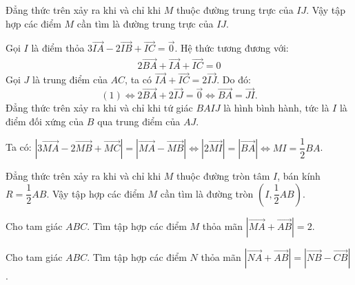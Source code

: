 \begin{bt}
{\begin{listEX}[1]
			Đẳng thức trên xảy ra khi và chỉ khi $M$ thuộc đường trung trực của $IJ$. Vậy tập hợp các điểm $M$ cần tìm là đường trung trực của $IJ$.
			\item Gọi $I$ là điểm thỏa $3\overrightarrow{IA} - 2\overrightarrow{IB} + \overrightarrow{IC} = \overrightarrow{0}$. Hệ thức tương đương với:
			\begin{align*}
			2\overrightarrow{BA} + \overrightarrow{IA} + \overrightarrow{IC} =0 \tag{1}
			\end{align*}
			Gọi $J$ là trung điểm của $AC$, ta có $\overrightarrow{IA} + \overrightarrow{IC} = 2\overrightarrow{IJ}$. Do đó:
			$$(1) \Leftrightarrow 2\overrightarrow{BA} + 2\overrightarrow{IJ} = \overrightarrow{0} \Leftrightarrow\overrightarrow{BA} = \overrightarrow{JI}.$$
			Đẳng thức trên xảy ra khi và chỉ khi tứ giác $BAIJ$ là hình bình hành, tức là $I$ là điểm đối xứng của $B$ qua trung điểm của $AJ$.
			
			Ta có: $\left| 3\overrightarrow{MA}-2\overrightarrow{MB}+\overrightarrow{MC} \right|=\left| \overrightarrow{MA}-\overrightarrow{MB} \right| \Leftrightarrow \left|2\overrightarrow{MI}\right| = \left|\overrightarrow{BA}\right| \Leftrightarrow MI = \dfrac{1}{2}BA$.
			
			Đẳng thức trên xảy ra khi và chỉ khi $M$ thuộc đường tròn tâm $I$, bán kính $R = \dfrac{1}{2}AB$. Vậy tập hợp các điểm $M$ cần tìm là đường tròn $\left(I,\dfrac{1}{2}AB\right)$.
		\end{listEX}
		
	}
\end{bt}

\begin{bt}%
Cho tam giác $ABC$. Tìm tập hợp các điểm $M$ thỏa mãn $\left|\overrightarrow{MA}+\overrightarrow{AB}\right|=2$.
\end{bt}

\begin{bt}%
	Cho tam giác $ABC$. Tìm tập hợp các điểm $N$ thỏa mãn $\left|\overrightarrow{NA}+\overrightarrow{AB}\right|=\left|\overrightarrow{NB}-\overrightarrow{CB}\right|$.
\end{bt}

